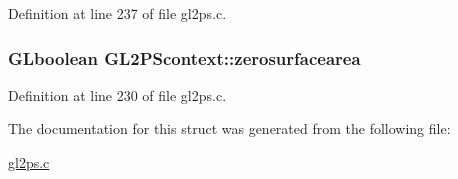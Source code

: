 Definition at line 237 of file gl2ps.\+c.

\hypertarget{struct_g_l2_p_scontext_a0c2b1ec59d2c6ecd8a12703cad451569}{}
\subsubsection[{zerosurfacearea}]{\setlength{\rightskip}{0pt plus 5cm}G\+Lboolean G\+L2\+P\+Scontext\+::zerosurfacearea}\label{struct_g_l2_p_scontext_a0c2b1ec59d2c6ecd8a12703cad451569}


Definition at line 230 of file gl2ps.\+c.



The documentation for this struct was generated from the following file\+:\begin{DoxyCompactItemize}
\item 
\hyperlink{gl2ps_8c}{gl2ps.\+c}\end{DoxyCompactItemize}

